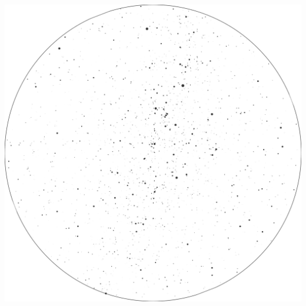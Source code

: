 \documentclass{./SAS-class-skygen}
\begin{document}
	\vspace{0.5cm}
    \begin{center}
    \includegraphics[width=\textwidth]{./pics/skychart42.png}
    \end{center}
    
    
\end{document}
